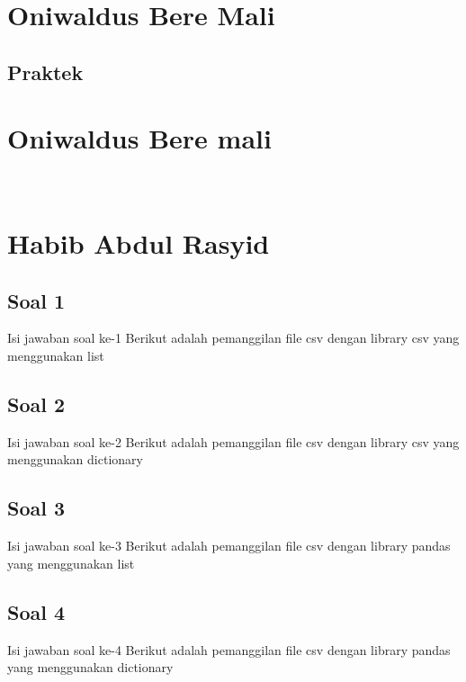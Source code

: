 \section{Oniwaldus Bere Mali}
\subsection{Praktek}
\section{Oniwaldus Bere mali}
\












\section{Habib Abdul Rasyid}
\subsection{Soal 1}
Isi jawaban soal ke-1
Berikut adalah pemanggilan file csv dengan library csv yang menggunakan list
    
\subsection{Soal 2}
Isi jawaban soal ke-2
Berikut adalah pemanggilan file csv dengan library csv yang menggunakan dictionary
    
\subsection{Soal 3}
Isi jawaban soal ke-3
Berikut adalah pemanggilan file csv dengan library pandas yang menggunakan list
    
\subsection{Soal 4}
Isi jawaban soal ke-4
 Berikut adalah pemanggilan file csv dengan library pandas yang menggunakan dictionary
    
